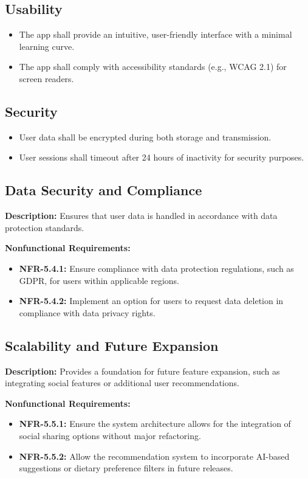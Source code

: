 \documentclass[12pt]{article}
\begin{document}
\subsection{Usability}
\begin{itemize}
    \item The app shall provide an intuitive, user-friendly interface with a minimal learning curve.
    \item The app shall comply with accessibility standards (e.g., WCAG 2.1) for screen readers.
\end{itemize}

\subsection{Security}
\begin{itemize}
    \item User data shall be encrypted during both storage and transmission.
    \item User sessions shall timeout after 24 hours of inactivity for security purposes.
\end{itemize}

\subsection{Data Security and Compliance}
\textbf{Description:} Ensures that user data is handled in accordance with data protection standards.

\textbf{Nonfunctional Requirements:}
\begin{itemize}
    \item \textbf{NFR-5.4.1:} Ensure compliance with data protection regulations, such as GDPR, for users within applicable regions.
    \item \textbf{NFR-5.4.2:} Implement an option for users to request data deletion in compliance with data privacy rights.
\end{itemize}

\subsection{Scalability and Future Expansion}
\textbf{Description:} Provides a foundation for future feature expansion, such as integrating social features or additional user recommendations.

\textbf{Nonfunctional Requirements:}
\begin{itemize}
    \item \textbf{NFR-5.5.1:} Ensure the system architecture allows for the integration of social sharing options without major refactoring.
    \item \textbf{NFR-5.5.2:} Allow the recommendation system to incorporate AI-based suggestions or dietary preference filters in future releases.
\end{itemize}
\end{document}
